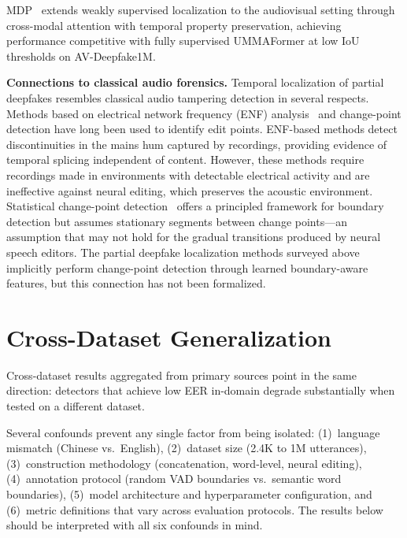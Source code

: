 \documentclass[journal]{IEEEtran}
\begin{document}
MDP~\cite{xu2025mdp} extends weakly supervised localization to the audiovisual setting through cross-modal attention with temporal property preservation, achieving performance competitive with fully supervised UMMAFormer at low IoU thresholds on AV-Deepfake1M.

\textbf{Connections to classical audio forensics.} Temporal localization of partial deepfakes resembles classical audio tampering detection in several respects. Methods based on electrical network frequency (ENF) analysis~\cite{zhao2024atd,wang2022enfdeep} and change-point detection have long been used to identify edit points. ENF-based methods detect discontinuities in the mains hum captured by recordings, providing evidence of temporal splicing independent of content. However, these methods require recordings made in environments with detectable electrical activity and are ineffective against neural editing, which preserves the acoustic environment. Statistical change-point detection~\cite{truong2020selective} offers a principled framework for boundary detection but assumes stationary segments between change points---an assumption that may not hold for the gradual transitions produced by neural speech editors. The partial deepfake localization methods surveyed above implicitly perform change-point detection through learned boundary-aware features, but this connection has not been formalized.

\section{Cross-Dataset Generalization}
\label{sec:generalization}

Cross-dataset results aggregated from primary sources point in the same direction: detectors that achieve low EER in-domain degrade substantially when tested on a different dataset.

Several confounds prevent any single factor from being isolated: (1)~language mismatch (Chinese vs.\ English), (2)~dataset size (2.4K to 1M utterances), (3)~construction methodology (concatenation, word-level, neural editing), (4)~annotation protocol (random VAD boundaries vs.\ semantic word boundaries), (5)~model architecture and hyperparameter configuration, and (6)~metric definitions that vary across evaluation protocols. The results below should be interpreted with all six confounds in mind.
\end{document}

